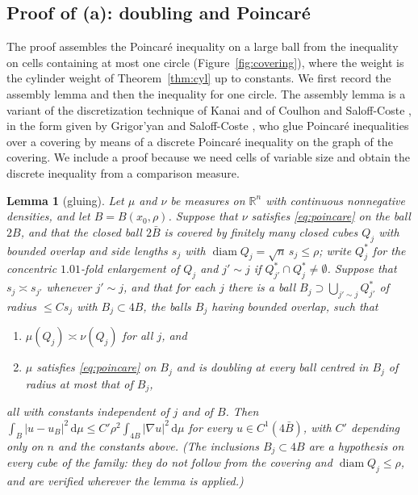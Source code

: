\documentclass[11pt]{amsart}
\newcommand{\R}{\mathbb{R}}
\newcommand{\dd}{\,\mathrm{d}}
\newcommand{\abs}[1]{\lvert #1\rvert}
\theoremstyle{plain}
\newtheorem{lemma}[theorem]{Lemma}
\theoremstyle{definition}
\theoremstyle{remark}
\begin{document}
\subsection{Proof of (a): doubling and Poincar\'e}
The proof assembles the Poincar\'e inequality on a large ball from the
inequality on cells containing at most one circle (Figure~\ref{fig:covering}),
where the weight is the
cylinder weight of Theorem~\ref{thm:cyl} up to constants. We first record the
assembly lemma and then the inequality for one circle. The assembly lemma is a
variant of the discretization technique of Kanai \cite{kanai1986} and of
Coulhon and Saloff-Coste \cite[Prop.~6.10, Thm.~7.1]{coulhonsaloffcoste1995},
in the form given by Grigor'yan and Saloff-Coste
\cite[Thm.~3.7]{grigoryansaloffcoste2005}, who glue Poincar\'e inequalities
over a covering by means of a discrete Poincar\'e inequality on the graph of
the covering. We include a proof because we need cells of variable size and
obtain the discrete inequality from a comparison measure.

\begin{lemma}[gluing]\label{lem:glue}
Let $\mu$ and $\nu$ be measures on $\R^n$ with continuous nonnegative
densities, and let $B=B(x_0,\rho)$. Suppose that $\nu$ satisfies
\eqref{eq:poincare} on the ball $2B$, and that the closed ball $2\bar B$ is
covered by finitely many closed cubes $Q_j$ with bounded overlap and side
lengths $s_j$ with $\operatorname{diam}Q_j=\sqrt n\,s_j\le\rho$; write $Q_j^*$
for the concentric $1.01$-fold enlargement of $Q_j$ and $j'\sim j$ if
$Q_{j'}^*\cap Q_j^*\ne\emptyset$. Suppose that $s_j\asymp s_{j'}$ whenever
$j'\sim j$, and that for each $j$ there is a ball $B_j\supset\bigcup_{j'\sim j}
Q_{j'}^*$ of radius $\le Cs_j$ with $B_j\subset4B$, the balls $B_j$ having
bounded overlap, such that
\begin{enumerate}[label=\textup{(G\arabic*)},leftmargin=2.6em,itemsep=1pt]
\item $\mu(Q_j)\asymp\nu(Q_j)$ for all $j$, and
\item $\mu$ satisfies \eqref{eq:poincare} on $B_j$ and is doubling at every
ball centred in $B_j$ of radius at most that of $B_j$,
\end{enumerate}
all with constants independent of $j$ and of $B$. Then
$\int_B\abs{u-u_B}^2\dd\mu\le C'\rho^2\int_{4B}\abs{\nabla u}^2\dd\mu$
for every $u\in C^1(4\bar B)$, with $C'$ depending only on $n$ and the
constants above. (The inclusions $B_j\subset4B$ are a hypothesis on every cube
of the family: they do not follow from the covering and
$\operatorname{diam}Q_j\le\rho$, and are verified wherever the lemma is
applied.)
\end{lemma}
\end{document}
